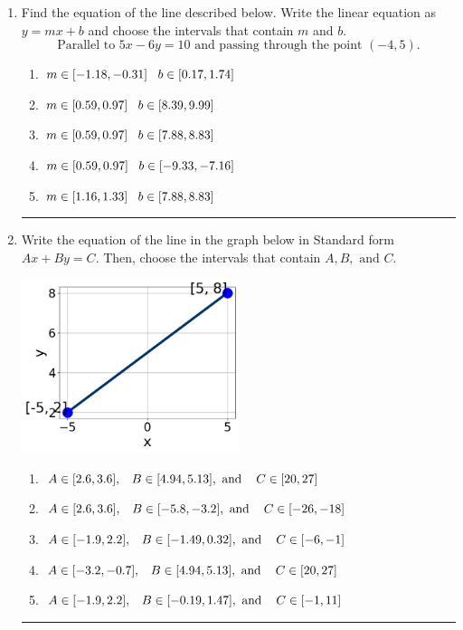 \documentclass[14pt]{extbook}
\newcommand{\litem}[1]{\item#1\hspace*{-1cm}\rule{\textwidth}{0.4pt}}
\begin{document}
\begin{enumerate}
{\begin{enumerate}[label=\Alph*.]
\end{enumerate} }
\litem{
Find the equation of the line described below. Write the linear equation as $ y=mx+b $ and choose the intervals that contain $m$ and $b$.\[ \text{Parallel to } 5 x - 6 y = 10 \text{ and passing through the point } (-4, 5). \]\begin{enumerate}[label=\Alph*.]
\item \( m \in [-1.18, -0.31] \hspace*{3mm} b \in [0.17, 1.74] \)
\item \( m \in [0.59, 0.97] \hspace*{3mm} b \in [8.39, 9.99] \)
\item \( m \in [0.59, 0.97] \hspace*{3mm} b \in [7.88, 8.83] \)
\item \( m \in [0.59, 0.97] \hspace*{3mm} b \in [-9.33, -7.16] \)
\item \( m \in [1.16, 1.33] \hspace*{3mm} b \in [7.88, 8.83] \)

\end{enumerate} }
\litem{
Write the equation of the line in the graph below in Standard form $Ax+By=C$. Then, choose the intervals that contain $A, B, \text{ and } C$.
\begin{center}
    \includegraphics[width=0.5\textwidth]{../Figures/linearGraphToStandardCopyB.png}
\end{center}
\begin{enumerate}[label=\Alph*.]
\item \( A \in [2.6, 3.6], \hspace{3mm} B \in [4.94, 5.13], \text{ and } \hspace{3mm} C \in [20, 27] \)
\item \( A \in [2.6, 3.6], \hspace{3mm} B \in [-5.8, -3.2], \text{ and } \hspace{3mm} C \in [-26, -18] \)
\item \( A \in [-1.9, 2.2], \hspace{3mm} B \in [-1.49, 0.32], \text{ and } \hspace{3mm} C \in [-6, -1] \)
\item \( A \in [-3.2, -0.7], \hspace{3mm} B \in [4.94, 5.13], \text{ and } \hspace{3mm} C \in [20, 27] \)
\item \( A \in [-1.9, 2.2], \hspace{3mm} B \in [-0.19, 1.47], \text{ and } \hspace{3mm} C \in [-1, 11] \)


\end{enumerate}}
\end{enumerate}
\end{document}
